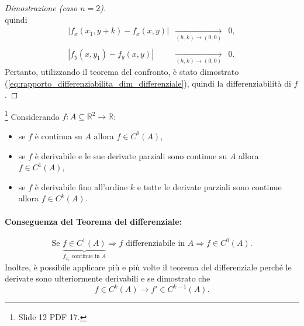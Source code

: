 \begin{proof}[Dimostrazione (caso $n=2$)]
\begin{equation*}
	\end{equation*}
	quindi
	\begin{equation*}
		\begin{matrix}
			|f_x(x_1,y+k)-f_x(x,y)| &\underset{(h,k)\rightarrow(0,0)}{\longrightarrow}& 0,\\\\
			|f_y(x,y_1) - f_y(x,y)| &\underset{(h,k)\rightarrow(0,0)}{\longrightarrow}& 0.
		\end{matrix}
	\end{equation*}
	Pertanto, utilizzando il teorema del confronto, è stato dimostrato (\ref{eq:rapporto_differenziabilita_dim_differenziale}), quindi la differenziabilità di $f$.
\end{proof}

\addtocounter{footnote}{-3}




\begin{property}\footnote{Slide 12 PDF 17.}
	Considerando $f:A\subseteq\mathbb{R}^2\rightarrow\mathbb{R}$:
	\begin{itemize}
		\item se $f$ è continua su $A$ allora $f\in C^0(A)$,
		\item se $f$ è derivabile e le sue derivate parziali sono continue su $A$ allora $f\in C^1(A)$,
		\item se $f$ è derivabile fino all'ordine $k$ e tutte le derivate parziali sono continue allora $f\in C^k(A)$.
	\end{itemize}
\end{property}

\paragraph{Conseguenza del Teorema del differenziale:}
\begin{equation*}
	\text{Se } \underbrace{f\in C^1(A)}_{f_{x_i}\text{ continue in }A}\Longrightarrow f \text{ differenziabile in } A\Longrightarrow f\in C^0(A).
\end{equation*}
Inoltre, è possibile applicare più e più volte il teorema del differenziale perché le derivate sono ulteriormente derivabili e se dimostrato che
\begin{equation*}
	f\in C^k(A)\rightarrow f'\in C^{k-1}(A).
\end{equation*}

